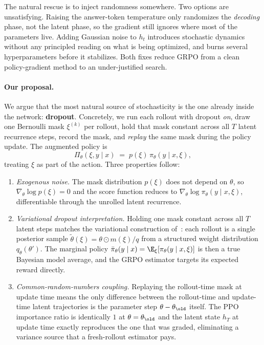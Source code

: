 The natural rescue is to inject randomness somewhere.  Two options are
unsatisfying.  Raising the answer-token temperature only randomizes the
\emph{decoding} phase, not the latent phase, so the gradient still ignores
where most of the parameters live.  Adding Gaussian noise to $h_t$
introduces stochastic dynamics without any principled reading on what is
being optimized, and burns several hyperparameters before it stabilizes.
Both fixes reduce GRPO from a clean policy-gradient method to an
under-justified search.

\paragraph{Our proposal.}
We argue that the most natural source of stochasticity is the one
already inside the network: \textbf{dropout}.  Concretely, we run each
rollout with dropout \emph{on}, draw one Bernoulli mask $\xi^{(k)}$ per
rollout, hold that mask constant across all $T$ latent recurrence steps,
record the mask, and \emph{replay} the same mask during the policy update.
The augmented policy is
\begin{equation}
\Pi_\theta(\xi, y \mid x)
   \;=\; p(\xi) \, \pi_\theta(y \mid x, \xi),
\label{eq:intro-augmented}
\end{equation}
treating $\xi$ as part of the action.  Three properties follow:

\begin{enumerate}[topsep=2pt,itemsep=2pt]
\item \emph{Exogenous noise.} The mask distribution $p(\xi)$ does not
      depend on $\theta$, so $\nabla_\theta \log p(\xi) = 0$ and the
      score function reduces to
      $\nabla_\theta \log \pi_\theta(y \mid x, \xi)$, differentiable
      through the unrolled latent recurrence.
\item \emph{Variational dropout interpretation.}  Holding one mask
      constant across all $T$ latent steps matches the variational
      construction of~\citet{gal2016dropout}: each rollout is a single
      posterior sample $\tilde\theta(\xi) = \theta \odot m(\xi)/q$ from
      a structured weight distribution $q_\theta(\theta')$.  The marginal
      policy $\bar\pi_\theta(y \mid x) = \E_{\xi}[\pi_\theta(y\mid x,\xi)]$
      is then a true Bayesian model average, and the GRPO estimator
      targets its expected reward directly.
\item \emph{Common-random-numbers coupling.}  Replaying the
      rollout-time mask at update time means the only difference between
      the rollout-time and update-time latent trajectories is the
      parameter step $\theta - \theta_\old$ itself.  The PPO importance
      ratio is identically $1$ at $\theta = \theta_\old$ and the latent
      state $h_T$ at update time exactly reproduces the one that was
      graded, eliminating a variance source that a fresh-rollout
      estimator pays.
\end{enumerate}

